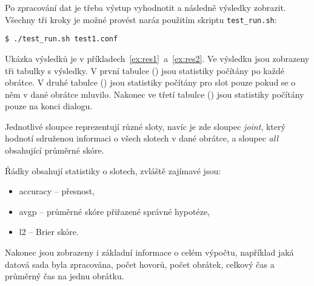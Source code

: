 Po zpracování dat je třeba výstup vyhodnotit a následně výsledky zobrazit.
Všechny tři kroky je možné provést naráz použitím skriptu \texttt{test\_run.sh}:

\begin{verbatim}
$ ./test_run.sh test1.conf
\end{verbatim}

Ukázka výsledků je v příkladech~\ref{ex:res1}~a~\ref{ex:res2}. 
Ve výsledku jsou zobrazeny tři tabulky s výsledky. 
V první tabulce () jsou statistiky počítány po každé obrátce.
V druhé tabulce () jsou statistiky počítány pro slot pouze pokud se o něm v dané obrátce mluvilo.
Nakonec ve třetí tabulce () jsou statistiky počítány pouze na konci dialogu.

Jednotlivé sloupce reprezentují různé sloty, navíc je zde sloupec \emph{joint}, který hodnotí sdruženou informaci o všech slotech v dané obrátce, a sloupec \emph{all} obsahující průměrné skóre.

Řádky obsahují statistiky o slotech, zvláště zajímavé jsou:
\begin{itemize}
\item accuracy -- přesnost,
\item avgp -- průměrné skóre přiřazené správné hypotéze,
\item l2 -- Brier skóre.
\end{itemize}

Nakonec jsou zobrazeny i základní informace o celém výpočtu, například jaká datová sada byla zpracována, počet hovorů, počet obrátek, celkový čas a průměrný čas na jednu obrátku.

